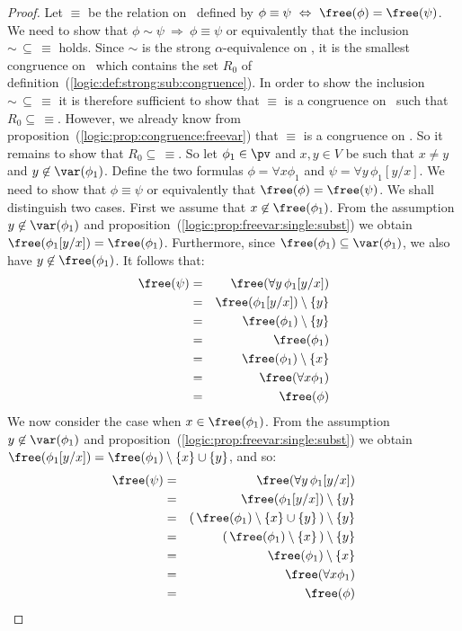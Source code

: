 \begin{proof}
Let $\equiv$ be the relation on \pv\ defined by $\phi\equiv\psi\
\Leftrightarrow\ \free(\phi)=\free(\psi)$. We need to show that
$\phi\sim\psi\ \Rightarrow\ \phi\equiv\psi$ or equivalently that the
inclusion $\sim\,\subseteq\,\equiv$ holds. Since $\sim$ is the
strong $\alpha$-equivalence on \pv, it is the smallest congruence
on \pv\ which contains the set $R_{0}$ of
definition~(\ref{logic:def:strong:sub:congruence}). In order to show
the inclusion $\sim\,\subseteq\,\equiv$ it is therefore sufficient
to show that $\equiv$ is a congruence on \pv\ such that
$R_{0}\subseteq\,\equiv$. However, we already know from
proposition~(\ref{logic:prop:congruence:freevar}) that $\equiv$ is a
congruence on \pv. So it remains to show that
$R_{0}\subseteq\,\equiv$. So let $\phi_{1}\in\pv$ and $x,y\in V$ be
such that $x\neq y$ and $y\not\in\var(\phi_{1})$. Define the two
formulas $\phi=\forall x\phi_{1}$ and $\psi=\forall
y\,\phi_{1}[y/x]$. We need to show that $\phi\equiv\psi$ or
equivalently that $\free(\phi)=\free(\psi)$. We shall distinguish
two cases. First we assume that $x\not\in\free(\phi_{1})$. From the
assumption $y\not\in\var(\phi_{1})$ and
proposition~(\ref{logic:prop:freevar:single:subst}) we obtain
$\free(\phi_{1}[y/x])=\free(\phi_{1})$. Furthermore, since
$\free(\phi_{1})\subseteq\var(\phi_{1})$, we also have
$y\not\in\free(\phi_{1})$. It follows that:
    \begin{eqnarray*}
    \free(\psi)&=&\free(\forall y\,\phi_{1}[y/x])\\
    &=&\free(\phi_{1}[y/x])\setminus\{y\}\\
    &=&\free(\phi_{1})\setminus\{y\}\\
    &=&\free(\phi_{1})\\
    &=&\free(\phi_{1})\setminus\{x\}\\
    &=&\free(\forall x\phi_{1})\\
    &=&\free(\phi)
    \end{eqnarray*}
We now consider the case when $x\in\free(\phi_{1})$. From the
assumption $y\not\in\var(\phi_{1})$ and
proposition~(\ref{logic:prop:freevar:single:subst}) we obtain
$\free(\phi_{1}[y/x])=\free(\phi_{1})\setminus\{x\}\cup\{y\}$, and
so:
\begin{eqnarray*}
    \free(\psi)&=&\free(\forall y\,\phi_{1}[y/x])\\
    &=&\free(\phi_{1}[y/x])\setminus\{y\}\\
    &=&(\,\free(\phi_{1})\setminus\{x\}\cup\{y\}\,)\setminus\{y\}\\
    &=&(\,\free(\phi_{1})\setminus\{x\}\,)\setminus\{y\}\\
    &=&\free(\phi_{1})\setminus\{x\}\\
    &=&\free(\forall x\phi_{1})\\
    &=&\free(\phi)
    \end{eqnarray*}
\end{proof}
